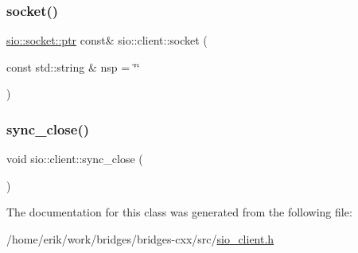 \mbox{\label{classsio_1_1client_a53459c95c2cd1c99ee7e6eec3181b947}} 
\subsubsection{\texorpdfstring{socket()}{socket()}}
{\footnotesize\ttfamily \hyperlink{classsio_1_1socket_afb4f5829acfc5c8181ddb7174c501593}{sio\+::socket\+::ptr} const\& sio\+::client\+::socket (\begin{DoxyParamCaption}\item[{const std\+::string \&}]{nsp = {\ttfamily \char`\"{}\char`\"{}} }\end{DoxyParamCaption})}

\mbox{\label{classsio_1_1client_a68787f325fdf4378b992329b123cde9d}} 
\subsubsection{\texorpdfstring{sync\+\_\+close()}{sync\_close()}}
{\footnotesize\ttfamily void sio\+::client\+::sync\+\_\+close (\begin{DoxyParamCaption}{ }\end{DoxyParamCaption})}



The documentation for this class was generated from the following file\+:\begin{DoxyCompactItemize}
\item 
/home/erik/work/bridges/bridges-\/cxx/src/\hyperlink{sio__client_8h}{sio\+\_\+client.\+h}\end{DoxyCompactItemize}
